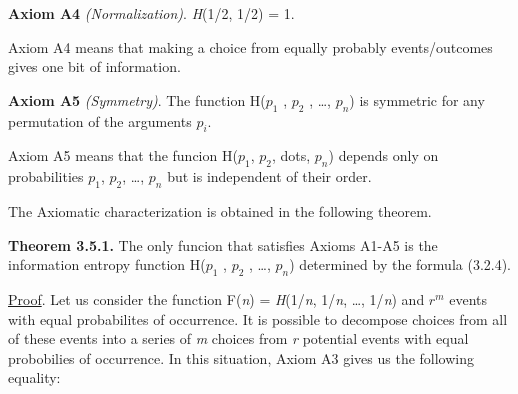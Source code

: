 \documentclass{extbook}
\begin{document}
\begin{center}

\end{center}

\textbf{Axiom A4} \textit{(Normalization)}.  \textit{H}(1/2, 1/2) = 1.

Axiom A4 means that making a choice from equally probably 
\linebreak
events/outcomes gives one bit of information.

    \textbf{Axiom A5} \textit{(Symmetry)}. The function H(\textit{$p_{1}$}
, \textit{$p_{2}$} , \dots, \textit{$p_{n}$}) is symmetric for any permutation of the arguments \textit{$p_{i}$}.

Axiom A5 means that the funcion H($p_{1}$, $p_{2}$, dots, $p_{n}$) depends only on probabilities $p_{1}$, $p_{2}$, \dots, $p_{n}$ but is independent of their order.

The Axiomatic characterization is obtained in the following theorem.

\textbf{Theorem 3.5.1.} The only funcion that satisfies Axioms A1-A5 is the information entropy function H(\textit{$p_{1}$}
, \textit{$p_{2}$} , \dots, \textit{$p_{n}$}) determined by the formula (3.2.4).

\underline{Proof}. Let us consider the function F(\textit{n}) = \textit{H}(1/\textit{n}, 1/\textit{n}, \dots, 1/\textit{n}) and $r^m$ events with equal probabilites of occurrence. It is possible to decompose choices from all of these events into a series of \textit{m} choices from \textit{r} potential events with equal probobilies of occurrence. In this situation, Axiom A3 gives us the following equality: 
\end{document}
